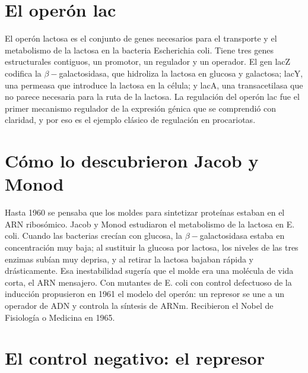 \documentclass{book}
\begin{document}

\section{El operón lac}

El operón lactosa es el conjunto de genes necesarios para el transporte y el metabolismo de la lactosa en la bacteria Escherichia coli. Tiene tres genes estructurales contiguos, un promotor, un regulador y un operador. El gen lacZ codifica la \(\beta-\)galactosidasa, que hidroliza la lactosa en glucosa y galactosa; lacY, una permeasa que introduce la lactosa en la célula; y lacA, una transacetilasa que no parece necesaria para la ruta de la lactosa. La regulación del operón lac fue el primer mecanismo regulador de la expresión génica que se comprendió con claridad, y por eso es el ejemplo clásico de regulación en procariotas.


\section{Cómo lo descubrieron Jacob y Monod}

Hasta 1960 se pensaba que los moldes para sintetizar proteínas estaban en el ARN ribosómico. Jacob y Monod estudiaron el metabolismo de la lactosa en E. coli. Cuando las bacterias crecían con glucosa, la \(\beta-\)galactosidasa estaba en concentración muy baja; al sustituir la glucosa por lactosa, los niveles de las tres enzimas subían muy deprisa, y al retirar la lactosa bajaban rápida y drásticamente. Esa inestabilidad sugería que el molde era una molécula de vida corta, el ARN mensajero. Con mutantes de E. coli con control defectuoso de la inducción propusieron en 1961 el modelo del operón: un represor se une a un operador de ADN y controla la síntesis de ARNm. Recibieron el Nobel de Fisiología o Medicina en 1965.


\section{El control negativo: el represor}
\end{document}
